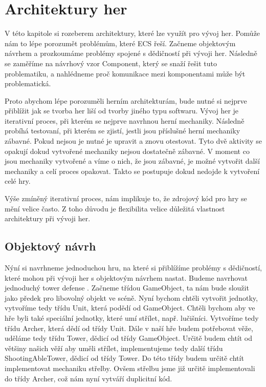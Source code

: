 \chapter{Architektury her}
V této kapitole si rozeberem architektury, které lze využít pro vývoj her. Pomůže nám to lépe porozumět problémům, které ECS řeší. Začneme objektovým návrhem a prozkoumáme problémy spojené s dědičností při vývoji her. Následně se zaměříme na návrhový vzor Component, který se snaží řešit tuto problematiku, a nahlédneme proč komunikace mezi komponentami může být problematická.

Proto abychom lépe porozuměli herním architekturám, bude nutné si nejprve přiblížit jak se tvorba her liší od tvorby jiného typu softwaru. Vývoj her je iterativní proces, při kterém se nejprve navrhnou herní mechaniky. Následně probíhá testovaní, při kterém se zjistí, jestli jsou příslušné herní mechaniky zábavné. Pokud nejsou je nutné je upravit a znovu otestovat. Tyto dvě aktivity se opakují dokud vytvořené mechaniky nejsou dostatečně zábavné. V moment co jsou mechaniky vytvořené a víme o nich, že jsou zábavné, je možné vytvořit další mechaniky a celí proces opakovat. Takto se postupuje dokud nedojde k vytvoření celé hry.

Výše zmíněný iterativní proces, nám implikuje to, že zdrojový kód pro hry se mění velice často. Z toho důvodu je flexibilita velice důležitá vlastnost architektury při vývoji her.

\section{Objektový návrh}


Nýní si navrhneme jednoduchou hru, na které si přiblížíme problémy s dědičností, které mohou při vývoji her s objektovým návrhem nastat. Budeme navrhovat jednoduchý tower defense . Začneme třídou GameObject, ta nám bude sloužit jako předek pro libovolný objekt ve scéně. Nyní bychom chtěli vytvořit jednotky, vytvoříme tedy třídu Unit, která podědí od GameObject. Chtěli bychom aby ve hře byli také speciální jednotky, které umí střílet, např. lučišníci. Vytvoříme tedy třídu Archer, která dědí od třídy Unit. Dále v naší hře budem potřebovat věže, uděláme tedy třídu Tower, dědicí od třídy GameObject. Určitě budem chtít od většiny našich věží aby uměli střílet, implementujeme tedy další třídu ShootingAbleTower, dědicí od třídy Tower. Do této třídy budem určitě chtít implementovat mechaniku střelby. Ovšem střelbu jsme již určitě implementovali do třídy Archer, což nám nyní vytváří duplicitní kód.

